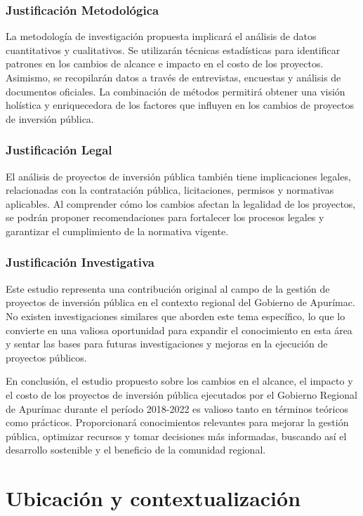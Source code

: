 \subsubsection{Justificación Metodológica}
La metodología de investigación propuesta implicará el análisis de datos cuantitativos y cualitativos. Se utilizarán técnicas estadísticas para identificar patrones en los cambios de alcance e impacto en el costo de los proyectos. Asimismo, se recopilarán datos a través de entrevistas, encuestas y análisis de documentos oficiales. La combinación de métodos permitirá obtener una visión holística y enriquecedora de los factores que influyen en los cambios de proyectos de inversión pública.

\subsubsection{Justificación Legal}

El análisis de proyectos de inversión pública también tiene implicaciones legales, relacionadas con la contratación pública, licitaciones, permisos y normativas aplicables. Al comprender cómo los cambios afectan la legalidad de los proyectos, se podrán proponer recomendaciones para fortalecer los procesos legales y garantizar el cumplimiento de la normativa vigente.

\subsubsection{Justificación Investigativa}
Este estudio representa una contribución original al campo de la gestión de proyectos de inversión pública en el contexto regional del Gobierno de Apurímac. No existen investigaciones similares que aborden este tema específico, lo que lo convierte en una valiosa oportunidad para expandir el conocimiento en esta área y sentar las bases para futuras investigaciones y mejoras en la ejecución de proyectos públicos.

En conclusión, el estudio propuesto sobre los cambios en el alcance, el impacto y el costo de los proyectos de inversión pública ejecutados por el Gobierno Regional de Apurímac durante el período 2018-2022 es valioso tanto en términos teóricos como prácticos. Proporcionará conocimientos relevantes para mejorar la gestión pública, optimizar recursos y tomar decisiones más informadas, buscando así el desarrollo sostenible y el beneficio de la comunidad regional.
\section{Ubicación y contextualización}
